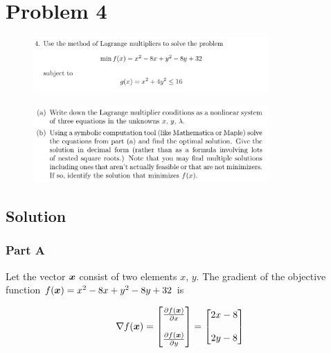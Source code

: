 
\begingroup
\allowdisplaybreaks

\newpage
\section{Problem 4}

\begin{figure}[h]
	\centering
	\includegraphics[width=0.8\textwidth]{./images/prob4_statement_1.png}
\end{figure}
\begin{figure}[h]
	\centering
	\includegraphics[width=0.8\textwidth]{./images/prob4_statement_2.png}
\end{figure}

\subsection{Solution}

\subsubsection{Part A}

Let the vector $\boldsymbol{x}$ consist of two elements $x,\,y$. The gradient of the objective function $f(\boldsymbol{x}) = x^2 - 8x + y^2 - 8y + 32$ is

\begin{align*}
	\nabla f (\boldsymbol{x}) = \begin{bmatrix} \frac{\partial f (\boldsymbol{x})}{\partial x} \\ \\ \frac{\partial f (\boldsymbol{x})}{\partial y} \end{bmatrix} = \begin{bmatrix} 2 x - 8 \\ \\ 2 y - 8 \end{bmatrix}
\end{align*}

